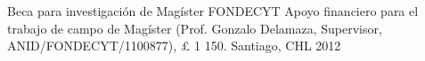 \vspace{1mm}


\vspace{1mm}

\begin{cvhonors}
\cvhonor
{Beca para investigación de Magíster FONDECYT}
{Apoyo financiero para el trabajo de campo de Magíster (Prof. Gonzalo Delamaza, Supervisor, ANID/FONDECYT/1100877), {\pounds} 1 150.}
{Santiago, CHL}
{2012}
\end{cvhonors}

\vspace{1mm}
